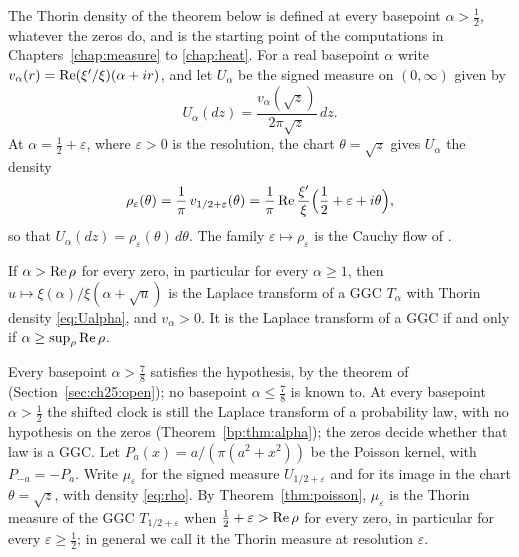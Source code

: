 The Thorin density of the theorem below is defined at every basepoint $\alpha>\frac12$, whatever the zeros do, and is the starting point of the computations in Chapters~\ref{chap:measure} to \ref{chap:heat}. For a real basepoint $\alpha$ write $v_\alpha(r)=\operatorname{Re}(\xi'/\xi)(\alpha+ir)$, and let $U_\alpha$ be the signed measure on $(0,\infty)$ given by
\begin{equation}\label{eq:Ualpha}
U_\alpha(dz)=\frac{v_\alpha(\sqrt z)}{2\pi\sqrt z}\,dz .
\end{equation}
At $\alpha=\frac12+\varepsilon$, where $\varepsilon>0$ is the resolution, the chart $\theta=\sqrt z$ gives $U_\alpha$ the density
\begin{equation}\label{eq:rho}
\rho_\varepsilon(\theta)=\frac1\pi\,v_{1/2+\varepsilon}(\theta)=\frac1\pi\operatorname{Re}\frac{\xi'}{\xi}\Big(\frac12+\varepsilon+i\theta\Big),
\end{equation}
so that $U_\alpha(dz)=\rho_\varepsilon(\theta)\,d\theta$. The family $\varepsilon\mapsto\rho_\varepsilon$ is the Cauchy flow of \cite[Chapter 8]{P26}.

\begin{theorem}\label{thm:poisson}
If $\alpha>\operatorname{Re}\rho$ for every zero, in particular for every $\alpha\ge1$, then $u\mapsto\xi(\alpha)/\xi(\alpha+\sqrt u)$ is the Laplace transform of a GGC $T_\alpha$ with Thorin density \eqref{eq:Ualpha}, and $v_\alpha>0$. It is the Laplace transform of a GGC if and only if $\alpha\ge\sup_\rho\operatorname{Re}\rho$.
\end{theorem}

Every basepoint $\alpha>\frac78$ satisfies the hypothesis, by the theorem of \cite{OAI26a} (Section~\ref{sec:ch25:open}); no basepoint $\alpha\le\frac78$ is known to. At every basepoint $\alpha>\frac12$ the shifted clock is still the Laplace transform of a probability law, with no hypothesis on the zeros (Theorem~\ref{bp:thm:alpha}); the zeros decide whether that law is a GGC. Let $P_a(x)=a/(\pi(a^2+x^2))$ be the Poisson kernel, with $P_{-a}=-P_a$. Write $\mu_\varepsilon$ for the signed measure $U_{1/2+\varepsilon}$ and for its image in the chart $\theta=\sqrt z$, with density \eqref{eq:rho}. By Theorem~\ref{thm:poisson}, $\mu_\varepsilon$ is the Thorin measure of the GGC $T_{1/2+\varepsilon}$ when $\frac12+\varepsilon>\operatorname{Re}\rho$ for every zero, in particular for every $\varepsilon\ge\frac12$; in general we call it the Thorin measure at resolution $\varepsilon$.

